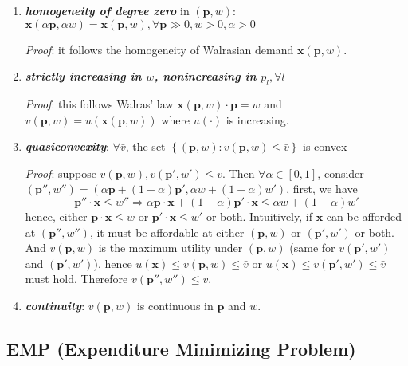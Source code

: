 \begin{enumerate}
    \item \textit{\textbf{homogeneity of degree zero}} in $(\mathbf{p},w)$: $\mathbf{x}(\alpha\mathbf{p},\alpha w)=\mathbf{x}(\mathbf{p},w),\forall \mathbf{p}\gg 0,w>0,\alpha>0$
    
    \textit{Proof}: it follows the homogeneity of Walrasian demand $\mathbf{x}(\mathbf{p},w)$.
    \item \textit{\textbf{strictly increasing in $w$, nonincreasing in $p_l,\forall l$}}
    
    \textit{Proof}: this follows Walras' law $\mathbf{x}(\mathbf{p},w)\cdot \mathbf{p}=w$ and $v(\mathbf{p},w)=u(\mathbf{x}(\mathbf{p},w))$ where $u(\cdot)$ is increasing.
    \item \textit{\textbf{quasiconvexity}}: $\forall \bar{v}$, the set $\left\{(\mathbf{p},w):v(\mathbf{p},w)\leq \bar{v}\right\}$ is convex
    
    \textit{Proof}: suppose $v(\mathbf{p},w), v(\mathbf{p}',w')\leq \bar{v}$. Then $\forall \alpha\in[0,1]$, consider $(\mathbf{p}'',w'')=\left( \alpha\mathbf{p}+(1-\alpha)\mathbf{p}',\alpha w+(1-\alpha)w' \right)$, 
    first, we have $$ \mathbf{p}''\cdot\mathbf{x}\leq w''\Rightarrow \alpha \mathbf{p}\cdot\mathbf{x}+(1-\alpha)\mathbf{p}'\cdot \mathbf{x}\leq \alpha w+(1-\alpha)w'$$ hence, either $\mathbf{p}\cdot\mathbf{x}\leq w$ 
    or $\mathbf{p}'\cdot\mathbf{x}\leq w'$ or both. Intuitively, if $\mathbf{x}$ can be afforded at $(\mathbf{p}'',w'')$, it must be affordable at either $(\mathbf{p},w)$ or $(\mathbf{p}',w')$ or both. And $v(\mathbf{p},w)$ 
    is the maximum utility under $(\mathbf{p},w)$ (same for $v(\mathbf{p}',w')$ and $(\mathbf{p}',w')$), hence $u(\mathbf{x})\leq v(\mathbf{p},w)\leq \bar{v}$ or $u(\mathbf{x})\leq v(\mathbf{p}',w')\leq \bar{v}$ must hold. 
    Therefore $ v(\mathbf{p}'',w'')\leq \bar{v}$.
    \item \textit{\textbf{continuity}}: $v(\mathbf{p},w)$ is continuous in $\mathbf{p}$ and $w$.
\end{enumerate}

\subsection{EMP (Expenditure Minimizing Problem)}